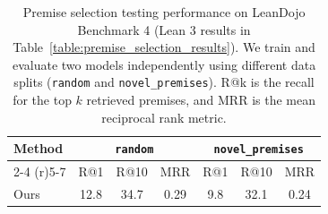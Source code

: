 \begin{table}[ht]
  \centering
  \caption{Premise selection testing performance on LeanDojo Benchmark 4 (Lean 3 results in  Table~\ref{table:premise_selection_results}). We train and evaluate two models independently using different data splits (\texttt{random} and \texttt{novel\_premises}). R@k is the recall for the top $k$ retrieved premises, and MRR is the mean reciprocal rank metric.}
  \begin{tabular}{@{}lcccccc@{}}
    \toprule
     Method & \multicolumn{3}{c}{\texttt{random}} & \multicolumn{3}{c}{\texttt{novel\_premises}} \\
     \cmidrule(r){2-4} \cmidrule(r){5-7} & R@1 & R@10 & MRR & R@1 & R@10 & MRR \\
    \midrule
    Ours & 12.8 & 34.7 & 0.29 & 9.8 & 32.1 & 0.24 \\
    \bottomrule
  \end{tabular}
  \label{table:lean4_premise_selection_results}
\end{table}
